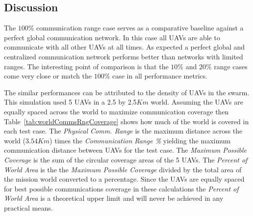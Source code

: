 \begin{multicols*}{2}



\chapter{Discussion}
\label{chap:discussion}

The $100\%$ communication range case serves as a comparative baseline against a perfect global communication network.  In this case all UAVs are able to communicate with all other UAVs at all times.  As expected a perfect global and centralized communication network performs better than networks with limited ranges.  The interesting point of comparison is that the $10\%$ and $20\%$ range cases come very close or match the $100\%$ case in all performance metrics. 

The similar performances can be attributed to the density of UAVs in the swarm.  This simulation used 5 UAVs in a 2.5 by 2.5$Km$ world.  Assuming the UAVs are equally spaced across the world to maximize communication coverage then Table~\ref{tab:worldCommsRngCoverage} shows how much of the world is covered in each test case.  The \textit{Physical Comm. Range} is the maximum distance across the world ($3.54Km$) times the \textit{Communication Range \%} yielding the maximum communication distance between UAVs for the test case.  The \textit{Maximum Possible Coverage} is the sum of the circular coverage areas of the 5 UAVs.  The \textit{Percent of World Area} is the the \textit{Maximum Possible Coverage} divided by the total area of the mission world converted to a percentage.  Since the UAVs are equally spaced for best possible communications coverage in these calculations the \textit{Percent of World Area} is a theoretical upper limit and will never be achieved in any practical means.


\end{multicols*}
